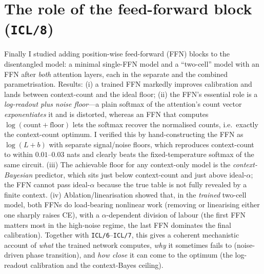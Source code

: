 \documentclass[12pt]{article}
\begin{document}
\section{The role of the feed-forward block (\texttt{ICL/8})}
Finally I studied adding position-wise feed-forward (FFN) blocks to the disentangled model: a
minimal single-FFN model and a ``two-cell'' model with an FFN after \emph{both} attention layers,
each in the separate and the combined parametrisation. Results: (i) a trained FFN markedly improves
calibration and lands between context-count and the ideal floor; (ii) the FFN's essential role is a
\emph{log-readout plus noise floor}---a plain softmax of the attention's count vector
\emph{exponentiates} it and is distorted, whereas an FFN that computes $\log(\text{count}+\text{floor})$
lets the softmax recover the normalised counts, i.e.\ exactly the context-count optimum. I verified
this by hand-constructing the FFN as $\log(L+b)$ with separate signal/noise floors, which reproduces
context-count to within $0.01\text{--}0.03$ nats and clearly beats the fixed-temperature softmax of
the same circuit. (iii) The achievable floor for any context-only model is the
\emph{context-Bayesian} predictor, which sits just below context-count and just above ideal-$\alpha$;
the FFN cannot pass ideal-$\alpha$ because the true table is not fully revealed by a finite context.
(iv) Ablation/linearisation showed that, in the \emph{trained} two-cell model, both FFNs do
load-bearing nonlinear work (removing or linearising either one sharply raises CE), with a
$\alpha$-dependent division of labour (the first FFN matters most in the high-noise regime, the last
FFN dominates the final calibration). Together with \texttt{ICL/6}--\texttt{ICL/7}, this gives a
coherent mechanistic account of \emph{what} the trained network computes, \emph{why} it sometimes
fails to (noise-driven phase transition), and \emph{how close} it can come to the optimum (the
log-readout calibration and the context-Bayes ceiling).
\end{document}

